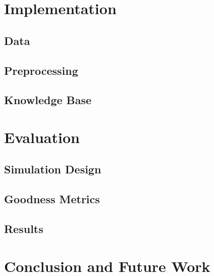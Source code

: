 \documentclass{iitkthesis}
\begin{document}
 \chapter{Implementation}
 \section{Data}
 \section{Preprocessing}
 \section{Knowledge Base}
 \chapter{Evaluation}
 \section{Simulation Design}
 \section{Goodness Metrics}
 \section{Results}
 \chapter{Conclusion and Future Work}


\end{document}
